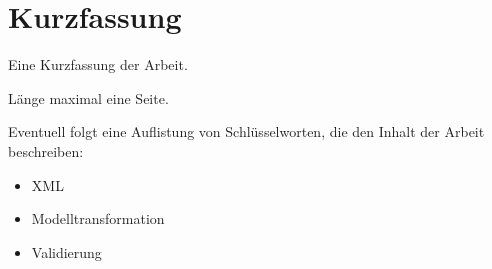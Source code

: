 
\chapter*{Kurzfassung}
\label{sec:kurzfassung}

Eine Kurzfassung der Arbeit.

Länge maximal eine Seite.

Eventuell folgt eine Auflistung von Schlüsselworten, die den Inhalt der Arbeit beschreiben: 
\begin{itemize}
 \item XML
 \item Modelltransformation
 \item Validierung
\end{itemize}